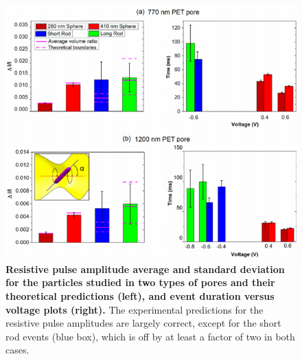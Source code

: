 			
			\begin{figure}
				\includegraphics[width=\textwidth]{dIexp}
				\caption{\textbf{Resistive pulse amplitude average and standard deviation for the particles studied in two types of pores and their theoretical predictions (left), and event duration versus voltage plots (right).} The experimental predictions for the resistive pulse amplitudes are largely correct, except for the short rod events (blue box), which is off by at least a factor of two in both cases.}
				\label{fig:dIexp}
			\end{figure}

